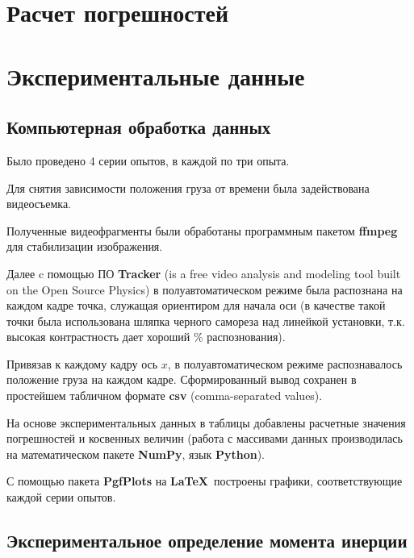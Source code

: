 \documentclass[a4paper,12pt]{article}
\begin{document}
\newpage
\section{Расчет погрешностей} %
\label{sec:ex}

\newpage
\section{Экспериментальные данные} %
\label{sec:ex}
\subsection{Компьютерная обработка данных}
    
Было проведено 4 серии опытов, в каждой по три опыта. 

Для снятия зависимости положения груза от времени была задействована видеосъемка.

Полученные видеофрагменты были обработаны программным пакетом \textbf{ffmpeg} для стабилизации изображения.

Далее c помощью ПО \textbf{Tracker} (is a free video analysis and modeling tool built on the Open Source Physics) в полуавтоматическом режиме была распознана на каждом кадре точка, служащая ориентиром для начала оси (в качестве такой точки была использована шляпка черного самореза над линейкой установки, т.к. высокая контрастность дает хороший \% распознования). 

Привязав к каждому кадру ось $x$, в полуавтоматическом режиме распознавалось положение груза на каждом кадре. Сформированный вывод сохранен в простейшем табличном формате \textbf{csv} (comma-separated values).

На основе экспериментальных данных в таблицы добавлены расчетные значения погрешностей и косвенных величин (работа с массивами данных производилась на математическом пакете \textbf{NumPy}, язык \textbf{Python}).

С помощью пакета \textbf{PgfPlots} на \textbf\LaTeX\ построены графики, соответствующие каждой серии опытов.  

\newpage
\subsection{Экспериментальное определение момента инерции}
\end{document}
